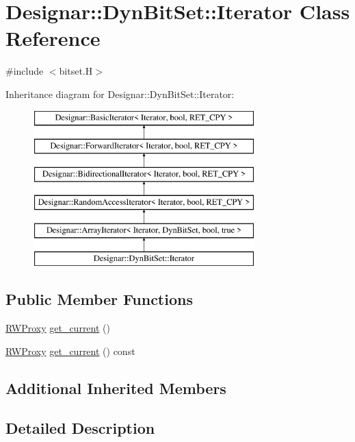 \hypertarget{class_designar_1_1_dyn_bit_set_1_1_iterator}{}\section{Designar\+:\+:Dyn\+Bit\+Set\+:\+:Iterator Class Reference}
\label{class_designar_1_1_dyn_bit_set_1_1_iterator}


{\ttfamily \#include $<$bitset.\+H$>$}

Inheritance diagram for Designar\+:\+:Dyn\+Bit\+Set\+:\+:Iterator\+:\begin{figure}[H]
\begin{center}
\leavevmode
\includegraphics[height=6.000000cm]{class_designar_1_1_dyn_bit_set_1_1_iterator}
\end{center}
\end{figure}
\subsection*{Public Member Functions}
\begin{DoxyCompactItemize}
\item 
\hyperlink{class_designar_1_1_dyn_bit_set_1_1_r_w_proxy}{R\+W\+Proxy} \hyperlink{class_designar_1_1_dyn_bit_set_1_1_iterator_a413eba67b23a9400666c18845bbe795a}{get\+\_\+current} ()
\item 
\hyperlink{class_designar_1_1_dyn_bit_set_1_1_r_w_proxy}{R\+W\+Proxy} \hyperlink{class_designar_1_1_dyn_bit_set_1_1_iterator_a034af8ec4f70d792837cab4923799e9f}{get\+\_\+current} () const
\end{DoxyCompactItemize}
\subsection*{Additional Inherited Members}


\subsection{Detailed Description}


